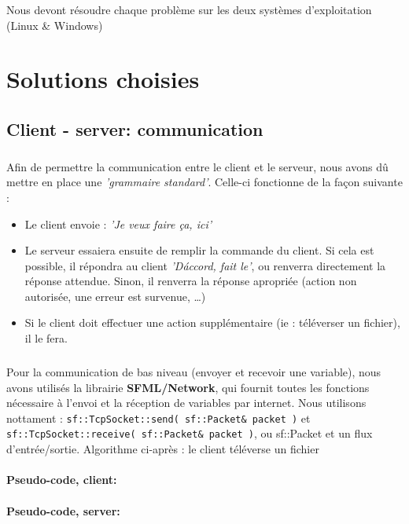 \documentclass[12pt,a4paper,twoside]{article}
\begin{document}
			Nous devont résoudre chaque problème sur les deux systèmes d'exploitation (Linux \& Windows)
	\section{Solutions choisies} %
		\subsection{Client - server: communication} %
			\subparagraph*{}
				Afin de permettre la communication entre le client et le serveur, nous avons dû mettre en place une \textit{'grammaire standard'}. Celle-ci fonctionne de la façon suivante :
				\begin{itemize}
					\item{} Le client envoie : \textit{'Je veux faire ça, ici'}
					\item{} Le serveur essaiera ensuite de remplir la commande du client. Si cela est possible, il répondra au client \textit{'D\'accord, fait le'}, ou renverra directement la réponse attendue. Sinon, il renverra la réponse apropriée (action non autorisée, une erreur est survenue, \ldots{})
					\item{} Si le client doit effectuer une action supplémentaire (ie : téléverser un fichier), il le fera.
				\end{itemize}
			\subparagraph*{}
				Pour la communication de bas niveau (envoyer et recevoir une variable), nous avons utilisés la librairie \textbf{SFML/Network}, qui fournit toutes les fonctions nécessaire à l'envoi et la réception de variables par internet. Nous utilisons nottament : \lstinline$sf::TcpSocket::send( sf::Packet& packet )$ et \lstinline$sf::TcpSocket::receive( sf::Packet& packet )$, ou sf::Packet et un flux d'entrée/sortie.
				Algorithme ci-après : le client téléverse un fichier
			\paragraph*{Pseudo-code, client:}
				
			\paragraph*{Pseudo-code, server:}
				
				
\end{document}
